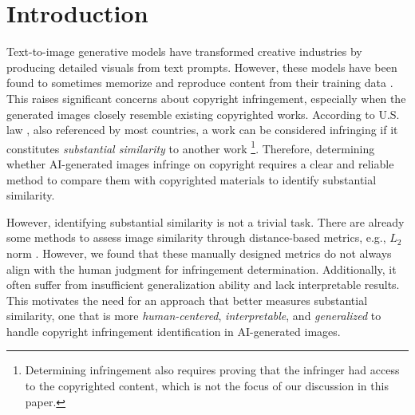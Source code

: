 \section{Introduction}
\label{introduction}
Text-to-image generative models \cite{Rombach_2022_CVPR, Betker2023ImprovingImageGeneration, team2023gemini, esser2024scaling, hurst2024gpt, zhang2023adding, zhang2023text, hintersdorf2024finding} have transformed creative industries by producing detailed visuals from text prompts. However, these models have been found to sometimes memorize and reproduce content from their training data \cite{carlini2023extracting,somepalli2023diffusion, ren2024copyright, wang2024replication, shi2024rlcp, shi2024copyright, zhang2024forget}. This raises significant concerns about copyright infringement, especially when the generated images closely resemble existing copyrighted works. According to U.S. law \cite{roth_greeting_cards_wikipedia}, also referenced by most countries, a work can be considered infringing if it constitutes \textit{substantial similarity} to another work \footnote{Determining infringement also requires proving that the infringer had access to the copyrighted content, which is not the focus of our discussion in this paper.}. Therefore, determining whether AI-generated images infringe on copyright requires a clear and reliable method to compare them with copyrighted materials to identify substantial similarity.

However, identifying substantial similarity is not a trivial task. There are already some methods to assess image similarity through distance-based metrics, e.g., $L_2$ norm \cite{carlini2023extracting}. However, we found that these manually designed metrics do not always align with the human judgment for infringement determination. Additionally, it often suffer from insufficient generalization ability and lack interpretable results. This motivates the need for an approach that better measures substantial similarity, one that is more \textit{human-centered}, \textit{interpretable}, and \textit{generalized} to handle copyright infringement identification in AI-generated images.



